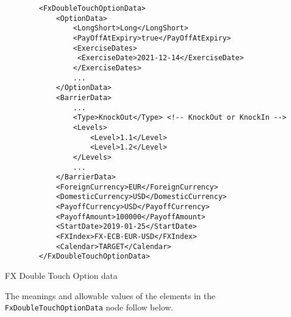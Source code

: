 \begin{listing}[H]
\begin{verbatim}
        <FxDoubleTouchOptionData>
            <OptionData>
                <LongShort>Long</LongShort>
                <PayOffAtExpiry>true</PayOffAtExpiry>
                <ExerciseDates>
                 <ExerciseDate>2021-12-14</ExerciseDate>
                </ExerciseDates>                     
                ...
            </OptionData>
            <BarrierData>
                ...
                <Type>KnockOut</Type> <!-- KnockOut or KnockIn -->
                <Levels>
                    <Level>1.1</Level>
                    <Level>1.2</Level>
                </Levels>
                ...
            </BarrierData>
            <ForeignCurrency>EUR</ForeignCurrency>
            <DomesticCurrency>USD</DomesticCurrency>
            <PayoffCurrency>USD</PayoffCurrency>
            <PayoffAmount>100000</PayoffAmount>            
            <StartDate>2019-01-25</StartDate>
            <FXIndex>FX-ECB-EUR-USD</FXIndex>            
            <Calendar>TARGET</Calendar>
        </FxDoubleTouchOptionData>
\end{verbatim}
\caption{FX Double Touch Option data}
\label{lst:fxdoubletouchoption_data}
\end{listing}

The meanings and allowable values of the elements in the \lstinline!FxDoubleTouchOptionData!  node follow below.

